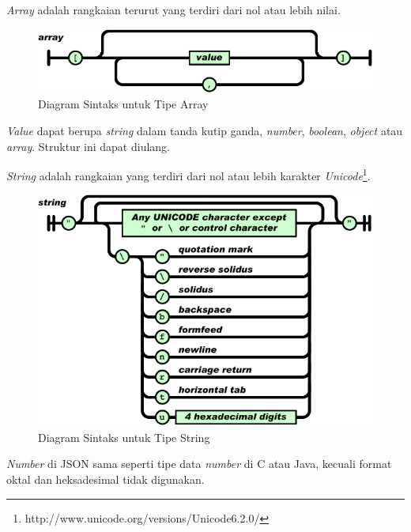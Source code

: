 \documentclass[a4paper, 12pt]{report}
\begin{document}
\onehalfspacing \textit{Array} adalah rangkaian terurut yang terdiri dari nol atau lebih nilai.

\begin{figure}[htp]
\centering
\includegraphics[scale=0.55]{images/array-json.png}
\caption{Diagram Sintaks untuk Tipe Array\cite{json-fat-free}}
\label{Diagram Sintaks untuk Tipe Array}
\end{figure}

\onehalfspacing \textit{Value} dapat berupa \textit{string} dalam tanda kutip ganda, \textit{number}, \textit{boolean}, \textit{object} atau \textit{array}. Struktur ini dapat diulang.

\onehalfspacing \textit{String} adalah rangkaian yang terdiri dari nol atau lebih karakter \textit{Unicode}\footnote{http://www.unicode.org/versions/Unicode6.2.0/}.

\begin{figure}[htp]
\centering
\includegraphics[scale=0.55]{images/string-json.png}
\caption{Diagram Sintaks untuk Tipe String\cite{json-fat-free}}
\label{Diagram Sintaks untuk Tipe String}
\end{figure}

\onehalfspacing \textit{Number} di JSON sama seperti tipe data \textit{number} di C atau Java, kecuali format oktal dan heksadesimal tidak digunakan.
\end{document}

